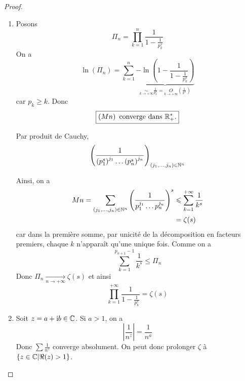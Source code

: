 \documentclass[12pt]{article}
\begin{document}
\begin{proof}
\begin{enumerate}
		\item Posons 
		\begin{equation*}\Pi_{n}=\prod_{k=1}^{n}\frac{1}{1-\frac{1}{p_{k}^{s}}}\end{equation*}
		On a 
		\begin{equation*}\ln\left(\Pi_{n}\right)=\sum_{k=1}^{n}\underbrace{-\ln\left(1-\frac{1}{1-\frac{1}{p_{k}^{s}}}\right)}_{\underset{k\to+\infty}{\sim}\frac{1}{p_{k}^{s}}=\underset{k\to+\infty}{O}\left(\frac{1}{k^{s}}\right)}\end{equation*}
		car $p_{k}\geqslant k$. 
		Donc 
		\begin{equation*}\boxed{\left(\Pi_{n}\right)\text{ converge dans }\R_{+}^{*}\text{.}}\end{equation*}
		
		Par produit de Cauchy,
		\begin{equation*}\left(\frac{1}{\left(p_{1}^{s}\right)^{j_{1}}\dots\left(p_{n}^{s}\right)^{j_{n}}}\right)_{(j_{1},\dots,j_{n})\in\mathbb{N}^{n}}\end{equation*}
		
		Ainsi, on a 
		\begin{align*}
			\Pi_{n}=\sum_{(j_{1},\dots,j_{n})\in\N^{n}}\left(\frac{1}{p_{1}^{j_{1}}\dots p_{n}^{j_{n}}}\right)^{s}
			&\leqslant\sum_{k=1}^{+\infty}\frac{1}{k^{s}}\\
			&=\zeta(s)
		\end{align*}
		car dans la première somme, par unicité de la décomposition en facteurs premiers, chaque $k$ n'apparaît qu'une unique fois.
		Comme on a 
		\begin{equation*}\sum_{k=1}^{p_{n+1}-1}\frac{1}{k^{s}}\leqslant \Pi_{n}\end{equation*}
		Donc $\Pi_{n}\xrightarrow[n\to+\infty]{}\zeta(s)$ et ainsi 
		\begin{equation*}\boxed{\prod_{k=1}^{+\infty}\frac{1}{1-\frac{1}{p_{k}^{s}}}=\zeta(s)}\end{equation*}

		\item Soit $z=a+\mathrm{i} b\in\mathbb{C}$. Si $a>1$, on a 
		\begin{equation*}\left\vert\frac{1}{n^{z}}\right\vert=\frac{1}{n^{a}}\end{equation*}
		Donc $\sum \frac{1}{n^{z}}$ converge absolument. On peut donc prolonger $\zeta$ à $\left\{z\in\mathbb{C}\middle|\Re(z)>1\right\}$.


\end{enumerate}
\end{proof}
\end{document}
